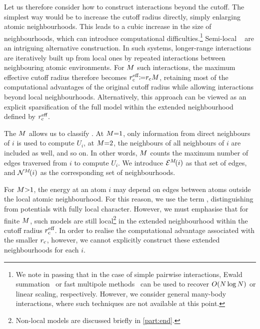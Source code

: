 Let us therefore consider how to construct interactions beyond the cutoff. The simplest way would be to increase the cutoff radius directly, simply enlarging atomic neighbourhoods. This leads to a cubic increase in the size of neighbourhoods, which can introduce computational difficulties.\footnote{We note in passing that in the case of simple pairwise interactions, Ewald summation~\cite{e1921p,dyp1993p} or fast multipole methods~\cite{gr1987p,wh1994p} can be used to recover $O(N \log N)$ or linear scaling, respectively. However, we consider general many-body interactions, where such techniques are not available at this point.}
Semi-local \glps{}~\cite{gsvd2017q,sktm2017q,sstm2018q,um2019q,kgg2020q,kbg2021q,ucsm2021q,bmsk2022q,bkoc2022q,bbkc2022a,blcd2022q} are an intriguing alternative construction. In such systems, longer-range interactions are iteratively built up from local ones by repeated interactions between neighbouring atomic environments. For $M$ such interactions, the maximum effective cutoff radius therefore becomes $r_{\text{c}}^{\text{eff}}{\coloneqq}r_{\text{c}} M$, retaining most of the computational advantages of the original cutoff radius while allowing interactions beyond local neighbourhoods.
Alternatively, this approach can be viewed as an explicit sparsification of the full model within the extended neighbourhood defined by $r_{\text{c}}^{\text{eff}}$.


The  $M$ allows us to classify \glps. 
At $M{=}1$, only information from direct neighbours of $i$ is used to compute $U_i$, at $M{=}2$, the neighbours of all neighbours of $i$ are included as well, and so on.
In other words, $M$ counts the maximum number of edges traversed from $i$ to compute $U_i$.
We introduce $\mathcal{E}^M\!(i)$ as that set of edges, and $\mathcal{N}^M\!(i)$ as the corresponding set of neighbourhoods.

For $M{>}1$, the energy at an atom $i$ may depend on edges between atoms outside the local atomic neighbourhood. For this reason, we use the term  \mlp, distinguishing from potentials with fully local character. 
However, we must emphasise that for finite $M$, such models are still local\footnote{Non-local models are discussed briefly in \cref{part:end}.} in the extended neighbourhood within the cutoff radius $r_{\text{c}}^{\text{eff}}$. In order to realise the computational advantage associated with the smaller $r_{\text{c}}$, however, we cannot explicitly construct these extended neighbourhoods for each $i$.

